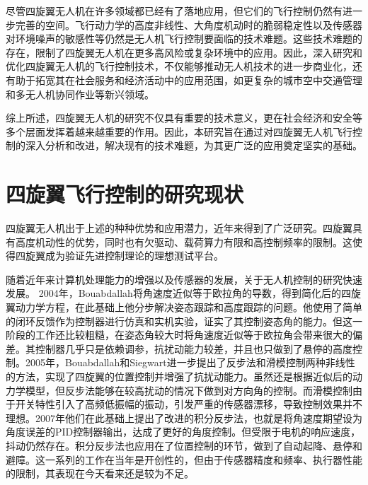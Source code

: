 尽管四旋翼无人机在许多领域都已经有了落地应用，但它们的飞行控制仍然有进一步完善的空间。飞行动力学的高度非线性、大角度机动时的脆弱稳定性以及传感器对环境噪声的敏感性等仍然是无人机飞行控制要面临的技术难题。这些技术难题的存在，限制了四旋翼无人机在更多高风险或复杂环境中的应用。因此，深入研究和优化四旋翼无人机的飞行控制技术，不仅能够推动无人机技术的进一步商业化，还有助于拓宽其在社会服务和经济活动中的应用范围，如更复杂的城市空中交通管理和多无人机协同作业等新兴领域。

综上所述，四旋翼无人机的研究不仅具有重要的技术意义，更在社会经济和安全等多个层面发挥着越来越重要的作用。因此，本研究旨在通过对四旋翼无人机飞行控制的深入分析和改进，解决现有的技术难题，为其更广泛的应用奠定坚实的基础。

\section{四旋翼飞行控制的研究现状}
四旋翼无人机出于上述的种种优势和应用潜力，近年来得到了广泛研究\cite{survey}。四旋翼具有高度机动性的优势，同时也有欠驱动、载荷算力有限和高控制频率的限制。这使得四旋翼成为验证先进控制理论的理想测试平台\cite{La2018}。


随着近年来计算机处理能力的增强以及传感器的发展，关于无人机控制的研究快速发展。
2004年，Bouabdallah将角速度近似等于欧拉角的导数，得到简化后的四旋翼动力学方程，在此基础上他分步解决姿态跟踪和高度跟踪的问题。他使用了简单的闭环反馈作为控制器进行仿真和实机实验，证实了其控制姿态角的能力\cite{boua2007}。但这一阶段的工作还比较粗糙，在姿态角较大时将角速度近似等于欧拉角会带来很大的偏差。其控制器几乎只是依赖调参，抗扰动能力较差，并且也只做到了悬停的高度控制。2005年，Bouabdallah和Siegwart进一步提出了反步法和滑模控制两种非线性的方法\cite{boua2005}，实现了四旋翼的位置控制并增强了抗扰动能力。虽然还是根据近似后的动力学模型，但反步法能够在较高扰动的情况下做到对方向角的控制。而滑模控制由于开关特性引入了高频低振幅的振动，引发严重的传感器漂移，导致控制效果并不理想。2007年他们在此基础上提出了改进的积分反步法\cite{bouabdallah2007full}，也就是将角速度期望设为角度误差的PID控制器输出，达成了更好的角度控制。但受限于电机的响应速度，抖动仍然存在。积分反步法也应用在了位置控制的环节，做到了自动起降、悬停和避障。这一系列的工作在当年是开创性的，但由于传感器精度和频率、执行器性能的限制，其表现在今天看来还是较为不足。

